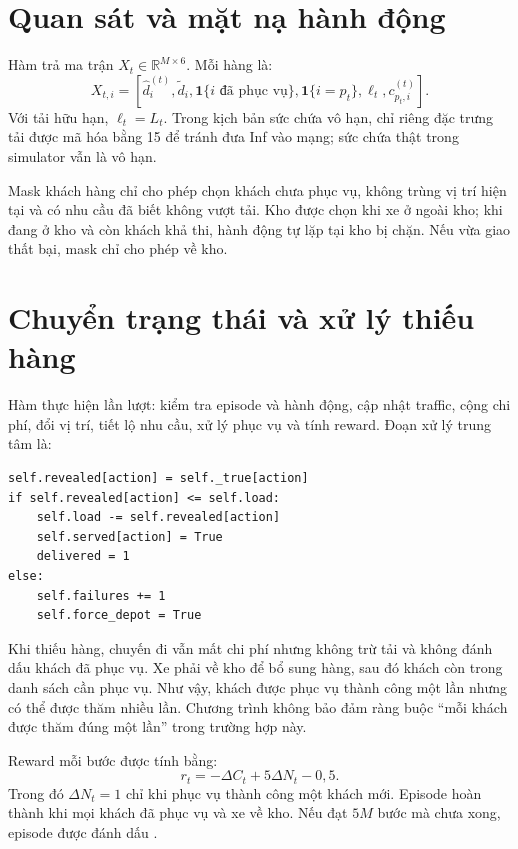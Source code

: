 \documentclass[12pt,a4paper,oneside]{report}
\newcommand{\file}[1]{\texttt{\detokenize{#1}}}
\newcommand{\ind}{\mathbf{1}}
\begin{document}
\section{Quan sát và mặt nạ hành động}
Hàm \file{observation()} trả ma trận $X_t\in\mathbb R^{M\times6}$.
Mỗi hàng là:
\begin{equation}
X_{t,i}=\left[
\widehat d_i^{(t)},\widetilde d_i,
\ind\{i\text{ đã phục vụ}\},\ind\{i=p_t\},
\ell_t,c_{p_t,i}^{(t)}\right].
\end{equation}
Với tải hữu hạn, $\ell_t=L_t$. Trong kịch bản sức chứa vô hạn, chỉ riêng
đặc trưng tải được mã hóa bằng 15 để tránh đưa Inf vào mạng; sức chứa
thật trong simulator vẫn là vô hạn.

Mask khách hàng chỉ cho phép chọn khách chưa phục vụ, không trùng vị
trí hiện tại và có nhu cầu đã biết không vượt tải. Kho được chọn khi xe
ở ngoài kho; khi đang ở kho và còn khách khả thi, hành động tự lặp tại
kho bị chặn. Nếu vừa giao thất bại, mask chỉ cho phép về kho.

\section{Chuyển trạng thái và xử lý thiếu hàng}\label{sec:recourse}
Hàm \file{step(action)} thực hiện lần lượt: kiểm tra episode và hành
động, cập nhật traffic, cộng chi phí, đổi vị trí, tiết lộ nhu cầu, xử lý
phục vụ và tính reward. Đoạn xử lý trung tâm là:
\begin{lstlisting}[caption={Xử lý nhu cầu thực khi xe đến khách}]
self.revealed[action] = self._true[action]
if self.revealed[action] <= self.load:
    self.load -= self.revealed[action]
    self.served[action] = True
    delivered = 1
else:
    self.failures += 1
    self.force_depot = True
\end{lstlisting}
Khi thiếu hàng, chuyến đi vẫn mất chi phí nhưng không trừ tải và không
đánh dấu khách đã phục vụ. Xe phải về kho để bổ sung hàng, sau đó khách
còn trong danh sách cần phục vụ. Như vậy, khách được phục vụ thành công
một lần nhưng có thể được thăm nhiều lần. Chương trình không bảo đảm
ràng buộc ``mỗi khách được thăm đúng một lần'' trong trường hợp này.

Reward mỗi bước được tính bằng:
\begin{equation}
r_t=-\Delta C_t+5\Delta N_t-0{,}5.
\end{equation}
Trong đó $\Delta N_t=1$ chỉ khi phục vụ thành công một khách mới.
Episode hoàn thành khi mọi khách đã phục vụ và xe về kho. Nếu đạt $5M$
bước mà chưa xong, episode được đánh dấu \file{truncated}.
\end{document}
